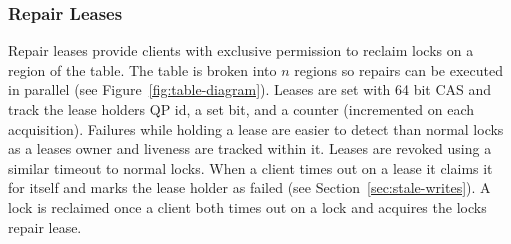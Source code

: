 
\subsubsection{Repair Leases}

Repair leases provide clients with exclusive permission to
reclaim locks on a region of the table. The table is broken
into $n$ regions so repairs can be executed in parallel (see
Figure~\ref{fig:table-diagram}). Leases are set with 64 bit
CAS and track the lease holders QP id, a set bit, and a
counter (incremented on each acquisition).  Failures while
holding a lease are easier to detect than normal locks as a
leases owner and liveness are tracked within it.  Leases are
revoked using a similar timeout to normal locks. When a
client times out on a lease it claims it for itself and
marks the lease holder as failed (see
Section~\ref{sec:stale-writes}).  A lock is reclaimed once a
client both times out on a lock and acquires the locks
repair lease. 



